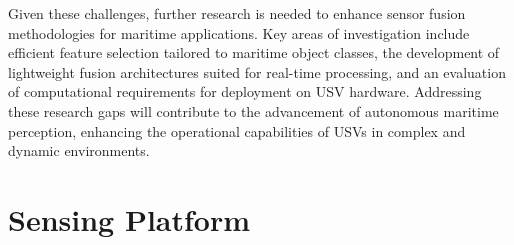\documentclass{erauthesis}
\begin{document}
Given these challenges, further research is needed to enhance sensor fusion methodologies for maritime applications. 
Key areas of investigation include efficient feature selection tailored to maritime object classes, the development of lightweight fusion architectures suited for real-time processing, and an evaluation of computational requirements for deployment on \ac{USV} hardware. 
Addressing these research gaps will contribute to the advancement of autonomous maritime perception, enhancing the operational capabilities of \acp{USV} in complex and dynamic environments.


\chapter{Sensing Platform} \label{sensing_platform}



\end{document}
